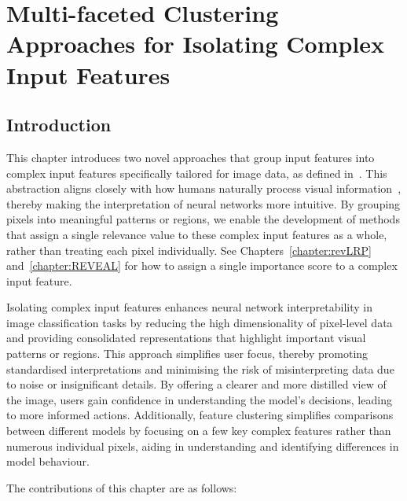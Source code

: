 \chapter{Multi-faceted Clustering Approaches for Isolating Complex Input Features}
\label{chap:clustering}
\section{Introduction}

This chapter introduces two novel approaches that group input features into complex input features specifically tailored for image data, as defined in~. This abstraction aligns closely with how humans naturally process visual information~\cite{fiantika2018internal}, thereby making the interpretation of neural networks more intuitive. By grouping pixels into meaningful patterns or regions, we enable the development of methods that assign a single relevance value to these complex input features as a whole, rather than treating each pixel individually. See Chapters~\ref{chapter:revLRP} and~\ref{chapter:REVEAL} for how to assign a single importance score to a complex input feature.

Isolating complex input features enhances neural network interpretability in image classification tasks by reducing the high dimensionality of pixel-level data and providing consolidated representations that highlight important visual patterns or regions. This approach simplifies user focus, thereby promoting standardised interpretations and minimising the risk of misinterpreting data due to noise or insignificant details. By offering a clearer and more distilled view of the image, users gain confidence in understanding the model's decisions, leading to more informed actions. Additionally, feature clustering simplifies comparisons between different models by focusing on a few key complex features rather than numerous individual pixels, aiding in understanding and identifying differences in model behaviour.

The contributions of this chapter are as follows:

